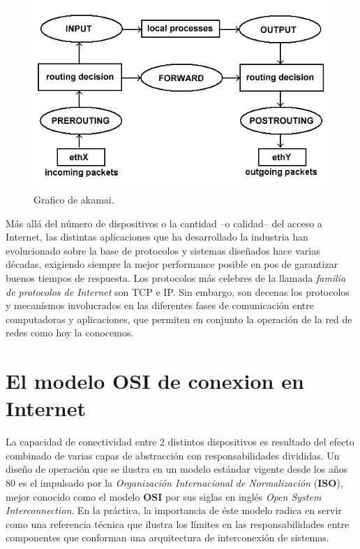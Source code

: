 \begin{figure}[!h]
	\centering
	\includegraphics[scale=.3]{imagenes/netfilterArchitecture}
	\caption{Grafico de akamai.}
	\label{netfilterArchitecture}
\end{figure}

Más allá del número de dispositivos o la cantidad --o calidad-- del acceso a Internet, las distintas aplicaciones que ha desarrollado la industria han evolucionado sobre la base de protocolos y sistemas diseñados hace varias décadas, exigiendo siempre la mejor performance posible en pos de garantizar buenos tiempos de respuesta. Los protocolos más celebres de la llamada \emph{familia de protocolos de Internet} son TCP e IP. Sin embargo, son decenas los protocolos y mecanísmos involucrados en las diferentes fases de comunicación entre computadoras y aplicaciones, que permiten en conjunto la operación de la red de redes como hoy la conocemos.

\section{El modelo OSI de conexion en Internet}
La capacidad de conectividad entre 2 distintos dispositivos es resultado del efecto combinado de varias capas de abstracción con responsabilidades divididas. Un diseño de operación que se ilustra en un modelo estándar vigente desde los años 80 es el impulsado por la \emph{Organización Internacional de Normalización} (\textbf{ISO}), mejor conocido como el modelo \textbf{OSI} por sus siglas en inglés \emph{Open System Interconnection}. En la práctica, la importancia de éste modelo radica en servir como una referencia técnica que ilustra los límites en las responsabilidades entre componentes que conforman una arquitectura de interconexión de sistemas.

